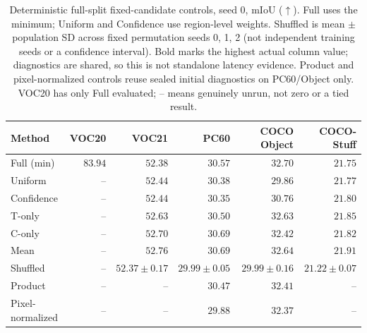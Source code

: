 \begin{table}[t]
\caption{Deterministic full-split fixed-candidate controls, seed 0, mIoU ($\uparrow$). Full uses the minimum; Uniform and Confidence use region-level weights. Shuffled is mean $\pm$ population SD across fixed permutation seeds 0, 1, 2 (not independent training seeds or a confidence interval). Bold marks the highest actual column value; diagnostics are shared, so this is not standalone latency evidence. Product and pixel-normalized controls reuse sealed initial diagnostics on PC60/Object only. VOC20 has only Full evaluated; -- means genuinely unrun, not zero or a tied result.}
\label{tab:mechanism}
\centering\small
\begin{tabular}{@{}lrrrrr@{}}
\toprule
Method & VOC20 & VOC21 & PC60 & COCO Object & COCO-Stuff \\
\midrule
Full (min) & $\mathbf{83.94}$ & $52.38$ & $30.57$ & $\mathbf{32.70}$ & $21.75$ \\
Uniform & -- & $52.44$ & $30.38$ & $29.86$ & $21.77$ \\
Confidence & -- & $52.44$ & $30.35$ & $30.76$ & $21.80$ \\
T-only & -- & $52.63$ & $30.50$ & $32.63$ & $21.85$ \\
C-only & -- & $52.70$ & $\mathbf{30.69}$ & $32.42$ & $21.82$ \\
Mean & -- & $\mathbf{52.76}$ & $30.69$ & $32.64$ & $\mathbf{21.91}$ \\
Shuffled & -- & $52.37\pm0.17$ & $29.99\pm0.05$ & $29.99\pm0.16$ & $21.22\pm0.07$ \\
Product & -- & -- & $30.47$ & $32.41$ & -- \\
Pixel-normalized & -- & -- & $29.88$ & $32.37$ & -- \\
\bottomrule
\end{tabular}
\end{table}
